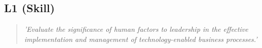 \subsection*{L1 (Skill)}

  \begin{quote}
    \textit{'Evaluate the significance of human factors to
    leadership in the effective implementation and
    management of technology-enabled business processes.'}
  \end{quote}

\newpage